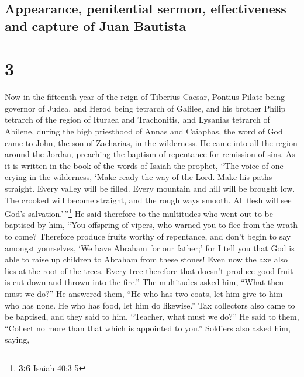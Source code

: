 \hypertarget{appearance-penitential-sermon-effectiveness-and-capture-of-juan-bautista}{%
\subsection{Appearance, penitential sermon, effectiveness and capture of
Juan
Bautista}\label{appearance-penitential-sermon-effectiveness-and-capture-of-juan-bautista}}

\hypertarget{section-2}{%
\section{3}\label{section-2}}

 Now in the fifteenth year of the reign of Tiberius
Caesar, Pontius Pilate being governor of Judea, and Herod being tetrarch
of Galilee, and his brother Philip tetrarch of the region of Ituraea and
Trachonitis, and Lysanias tetrarch of Abilene,  during the
high priesthood of Annas and Caiaphas, the word of God came to John, the
son of Zacharias, in the wilderness.  He came into all the
region around the Jordan, preaching the baptism of repentance for
remission of sins.  As it is written in the book of the
words of Isaiah the prophet, ``The voice of one crying in the
wilderness, `Make ready the way of the Lord. Make his paths straight.
 Every valley will be filled. Every mountain and hill will
be brought low. The crooked will become straight, and the rough ways
smooth.  All flesh will see God's
salvation.'\,''\footnote{\textbf{3:6} Isaiah 40:3-5}  He
said therefore to the multitudes who went out to be baptised by him,
``You offspring of vipers, who warned you to flee from the wrath to
come?  Therefore produce fruits worthy of repentance, and
don't begin to say amongst yourselves, `We have Abraham for our father;'
for I tell you that God is able to raise up children to Abraham from
these stones!  Even now the axe also lies at the root of
the trees. Every tree therefore that doesn't produce good fruit is cut
down and thrown into the fire.''  The multitudes asked
him, ``What then must we do?''  He answered them, ``He
who has two coats, let him give to him who has none. He who has food,
let him do likewise.''  Tax collectors also came to be
baptised, and they said to him, ``Teacher, what must we do?''
 He said to them, ``Collect no more than that which is
appointed to you.''  Soldiers also asked him, saying,
